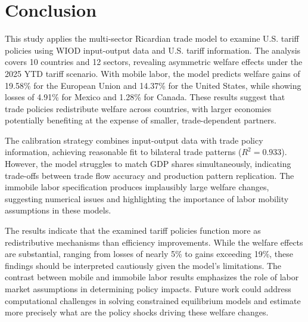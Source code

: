 \section{Conclusion}

This study applies the \cite{costinot2012TheReviewofEconomicStudies} multi-sector Ricardian trade model to examine U.S. tariff policies using WIOD input-output data and U.S. tariff information. The analysis covers 10 countries and 12 sectors, revealing asymmetric welfare effects under the 2025 YTD tariff scenario. With mobile labor, the model predicts welfare gains of 19.58\% for the European Union and 14.37\% for the United States, while showing losses of 4.91\% for Mexico and 1.28\% for Canada. These results suggest that trade policies redistribute welfare across countries, with larger economies potentially benefiting at the expense of smaller, trade-dependent partners.

The calibration strategy combines input-output data with trade policy information, achieving reasonable fit to bilateral trade patterns ($R^2 = 0.933$). However, the model struggles to match GDP shares simultaneously, indicating trade-offs between trade flow accuracy and production pattern replication. The immobile labor specification produces implausibly large welfare changes, suggesting numerical issues and highlighting the importance of labor mobility assumptions in these models.

The results indicate that the examined tariff policies function more as redistributive mechanisms than efficiency improvements. While the welfare effects are substantial, ranging from losses of nearly 5\% to gains exceeding 19\%, these findings should be interpreted cautiously given the model's limitations. The contrast between mobile and immobile labor results emphasizes the role of labor market assumptions in determining policy impacts. Future work could address computational challenges in solving constrained equilibrium models and estimate more precisely what are the policy shocks driving these welfare changes.